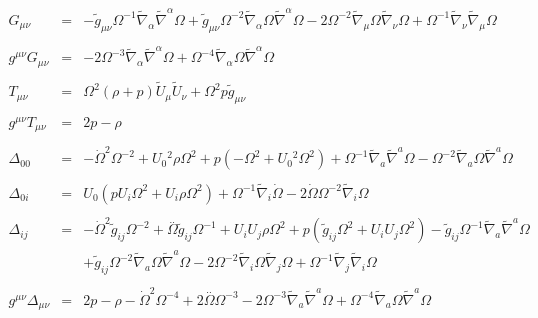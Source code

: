 \documentclass[10pt,letterpaper]{article}
\numberwithin{equation}{section}
\begin{document}
\begin{eqnarray}
G_{\mu\nu}&=&  - \tilde{g}_{\mu \nu } \Omega^{-1} \tilde{\nabla}_{\alpha }\tilde{\nabla}^{\alpha }\Omega + \tilde{g}_{\mu \nu } \Omega^{-2} \tilde{\nabla}_{\alpha }\Omega \tilde{\nabla}^{\alpha }\Omega - 2 \Omega^{-2} \tilde{\nabla}_{\mu }\Omega \tilde{\nabla}_{\nu }\Omega + \Omega^{-1} \tilde{\nabla}_{\nu }\tilde{\nabla}_{\mu }\Omega  
\\ \nonumber\\
g^{\mu\nu}G_{\mu\nu} &=& -2 \Omega^{-3} \tilde{\nabla}_{\alpha }\tilde{\nabla}^{\alpha }\Omega + \Omega^{-4} \tilde{\nabla}_{\alpha }\Omega \tilde{\nabla}^{\alpha }\Omega 
\\ \nonumber\\
T_{\mu\nu} &=&\Omega^2(\rho+p)\tilde U_\mu \tilde U_\nu + \Omega^2 p\tilde g_{\mu\nu}
\\ \nonumber\\
g^{\mu\nu}T_{\mu\nu} &=& 2p-\rho
\\ \nonumber \\
\Delta_{00}&=& - \dot{\Omega}^2 \Omega^{-2} + U_{0}{}^2 \rho \Omega^2 + p (- \Omega^2 + U_{0}{}^2 \Omega^2) + \Omega^{-1} \tilde{\nabla}_{a}\tilde{\nabla}^{a}\Omega -  \Omega^{-2} \tilde{\nabla}_{a}\Omega \tilde{\nabla}^{a}\Omega 
\\ \nonumber\\
\Delta_{0i}&=& U_{0}{} (p U_{i} \Omega^2 + U_{i} \rho \Omega^2) + \Omega^{-1} \tilde{\nabla}_{i}\dot{\Omega} - 2 \dot{\Omega} \Omega^{-2} \tilde{\nabla}_{i}\Omega 
\\ \nonumber\\
\Delta_{ij}&=& - \dot{\Omega}^2 \tilde{g}_{ij} \Omega^{-2} + \overset{..}{\Omega} \tilde{g}_{ij} \Omega^{-1} + U_{i} U_{j} \rho \Omega^2 + p (\tilde{g}_{ij} \Omega^2 + U_{i} U_{j} \Omega^2) -  \tilde{g}_{ij} \Omega^{-1} \tilde{\nabla}_{a}\tilde{\nabla}^{a}\Omega \nonumber \\ 
&& + \tilde{g}_{ij} \Omega^{-2} \tilde{\nabla}_{a}\Omega \tilde{\nabla}^{a}\Omega - 2 \Omega^{-2} \tilde{\nabla}_{i}\Omega \tilde{\nabla}_{j}\Omega + \Omega^{-1} \tilde{\nabla}_{j}\tilde{\nabla}_{i}\Omega 
\\ \nonumber\\
g^{\mu\nu}\Delta_{\mu\nu}&=& 2 p -  \rho -  \dot{\Omega}^2 \Omega^{-4} + 2 \overset{..}{\Omega} \Omega^{-3} - 2 \Omega^{-3} \tilde{\nabla}_{a}\tilde{\nabla}^{a}\Omega + \Omega^{-4} \tilde{\nabla}_{a}\Omega \tilde{\nabla}^{a}\Omega 
\end{eqnarray}
\end{document}
